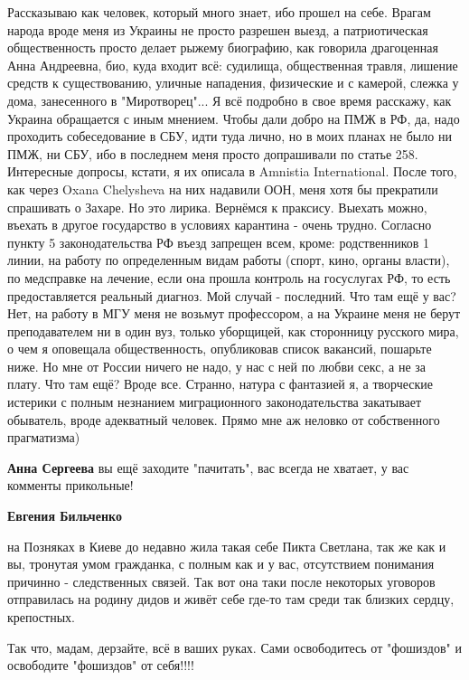 \begin{itemize}
\begin{itemize}
Рассказываю как человек, который много знает, ибо прошел на себе. Врагам народа
вроде меня из Украины не просто разрешен выезд, а патриотическая общественность
просто делает рыжему биографию, как говорила драгоценная Анна Андреевна, био,
куда входит всё: судилища, общественная травля, лишение средств к
существованию, уличные нападения, физические и с камерой, слежка у дома,
занесенного в "Миротворец"... Я всё подробно в свое время расскажу, как Украина
обращается с иным мнением. Чтобы дали добро на ПМЖ в РФ, да, надо проходить
собеседование в СБУ, идти туда лично, но в моих планах не было ни ПМЖ, ни СБУ,
ибо в последнем меня просто допрашивали по статье 258. Интересные допросы,
кстати, я их описала в Amnistia International. После того, как через Oxana
Chelysheva на них надавили ООН, меня хотя бы прекратили спрашивать о Захаре. Но
это лирика. Вернёмся к праксису. Выехать можно, въехать в другое государство в
условиях карантина - очень трудно. Согласно пункту 5 законодательства РФ въезд
запрещен всем, кроме: родственников 1 линии, на работу по определенным видам
работы (спорт, кино, органы власти), по медсправке на лечение, если она прошла
контроль на госуслугах РФ, то есть предоставляется реальный диагноз. Мой случай
- последний. Что там ещё у вас? Нет, на работу в МГУ меня не возьмут
профессором, а на Украине меня не берут преподавателем ни в один вуз, только
уборщицей, как сторонницу русского мира, о чем я оповещала общественность,
опубликовав список вакансий, пошарьте ниже. Но мне от России ничего не надо, у
нас с ней по любви секс, а не за плату. Что там ещё? Вроде все. Странно, натура
с фантазией я, а творческие истерики с полным незнанием миграционного
законодательства закатывает обыватель, вроде адекватный человек. Прямо мне аж
неловко от собственного прагматизма)

\textbf{Анна Сергеева} вы ещё заходите "пачитать", вас всегда не хватает, у вас комменты прикольные!

\textbf{Евгения Бильченко} 

на Позняках в Киеве до недавно жила такая себе Пикта Светлана, так же как и вы,
тронутая умом гражданка, с полным как и у вас, отсутствием понимания причинно -
следственных связей. Так вот она таки после некоторых уговоров отправилась на
родину дидов и живёт себе где-то там среди так близких сердцу, крепостных.

Так что, мадам, дерзайте, всё в ваших руках. Сами освободитесь от "фошиздов" и
освободите "фошиздов" от себя!!!!


\end{itemize}
\end{itemize}
